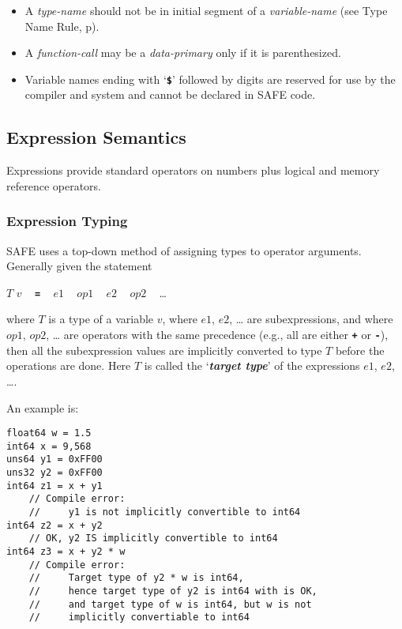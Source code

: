 \documentclass[12pt]{article}
\newcommand{\TT}[1]{{\tt \bfseries #1}}
\newcommand{\key}[1]{{\bf \em #1}\index{#1}}
\newcommand{\pagref}[1]{p\pageref{#1}}
\newcommand{\TMP}{\$}			%
\newenvironment{indpar}[1][0.3in]%
	{\begin{list}{}%
		     {\setlength{\itemsep}{0in}%
		      \setlength{\topsep}{0in}%
		      \setlength{\parsep}{1ex}%
		      \setlength{\labelwidth}{#1}%
		      \setlength{\leftmargin}{#1}%
		      \addtolength{\leftmargin}{\labelsep}}%
	 \item}%
	{\end{list}}
\begin{document}
\begin{indpar}
\begin{itemize}
\item
A {\em type-name} should not be in initial segment of a {\em variable-name}
(see Type Name Rule, \pagref{TYPE-NAME-RULE}).
\item
A {\em function-call} may be a {\em data-primary} only if it is
parenthesized.
\item
Variable names ending with `\TT{\TMP}' followed by digits are
reserved for use by the compiler and system and cannot be declared
in SAFE code.
\end{itemize}
\end{indpar}

\subsection{Expression Semantics}

Expressions provide standard operators on numbers plus logical and
memory reference operators.

\subsubsection{Expression Typing}
\label{EXPRESSION-TYPING}

SAFE uses a top-down method of assigning types to operator arguments.
Generally given the statement
\begin{center}
$T$ $v$ ~ \TT{=} ~ $e1$ ~ $op1$ ~ $e2$ ~ $op2$ ~ \ldots{}
\end{center}
where $T$ is a type of a variable $v$, where $e1$, $e2$, \ldots{} are
subexpressions, and where $op1$, $op2$, \ldots{} are operators with the
same precedence (e.g., all are either \TT{+} or \TT{-}), then
all the subexpression values are implicitly converted to type $T$
before the operations are done.  Here $T$ is called the `\key{target type}'
of the expressions $e1$, $e2$, \ldots{}.

An example is:

\begin{indpar}\begin{verbatim}
float64 w = 1.5
int64 x = 9,568
uns64 y1 = 0xFF00
uns32 y2 = 0xFF00
int64 z1 = x + y1
    // Compile error:
    //     y1 is not implicitly convertible to int64
int64 z2 = x + y2
    // OK, y2 IS implicitly convertible to int64
int64 z3 = x + y2 * w
    // Compile error:
    //     Target type of y2 * w is int64,
    //     hence target type of y2 is int64 with is OK,
    //     and target type of w is int64, but w is not
    //     implicitly convertiable to int64
\end{verbatim}\end{indpar}
\end{document}
